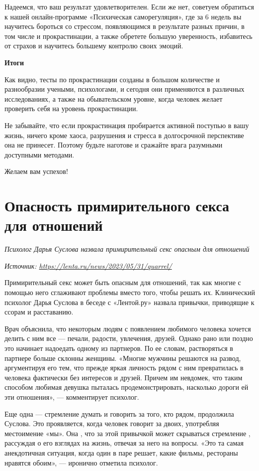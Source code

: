Надеемся, что ваш результат удовлетворителен. Если же нет, советуем обратиться к нашей онлайн-программе «Психическая саморегуляция», где за 6 недель вы научитесь бороться со стрессом, появляющимся в результате разных причин, в том числе и прокрастинации, а также обретете большую уверенность, избавитесь от страхов и научитесь большему контролю своих эмоций.

\newpage
\textbf{Итоги}

Как видно, тесты по прокрастинации созданы в большом количестве и разнообразии учеными, психологами, и сегодня они применяются в различных исследованиях, а также на обывательском уровне, когда человек желает проверить себя на уровень прокрастинации.

Не забывайте, что если прокрастинация пробирается активной поступью в вашу жизнь, ничего кроме хаоса, разрушения и стресса в долгосрочной перспективе она не принесет. Поэтому будьте наготове и сражайте врага разумными доступными методами.

Желаем вам успехов!


\newpage
\section{Опасность примирительного секса для отношений}

\textit{Психолог Дарья Суслова назвала примирительный секс опасным для отношений }

\textit{Источник: \url{https://lenta.ru/news/2023/05/31/quarrel/}}


Примирительный секс может быть опасным для отношений, так как многие с помощью него сглаживают проблемы вместо того, чтобы решать их. Клинический психолог Дарья Суслова в беседе с «Лентой.ру» назвала привычки, приводящие к ссорам и расставанию.

Врач объяснила, что некоторым людям с появлением любимого человека хочется делить с ним все — печали, радости, увлечения, друзей. Однако рано или поздно это начинает надоедать одному из партнеров. По ее словам, растворяться в партнере больше склонны женщины. «Многие мужчины решаются на развод, аргументируя его тем, что прежде яркая личность рядом с ним превратилась в человека фактически без интересов и друзей. Причем им невдомек, что таким способом любимая девушка пыталась продемонстрировать, насколько дороги ей эти отношения», — комментирует психолог.

Еще одна  --- стремление думать и говорить за того, кто рядом, продолжила Суслова. Это проявляется, когда человек говорит за двоих, употребляя местоимение «мы». Она , что за этой привычкой может скрываться стремление , рассуждая о его взглядах на жизнь, отвечая за него на вопросы. «Это та самая анекдотичная ситуация, когда один в паре решает, какие фильмы, рестораны нравятся обоим», — иронично отметила психолог.

